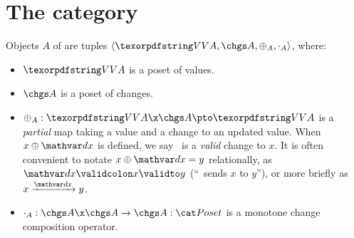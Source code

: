 \newcommand\upd{\mathbin{\oplus}}
\newcommand\updfn{\ensuremath{{\upd}}}
\newcommand\compose\cdot
\newcommand\composefn{\ensuremath{{\compose}}}
\newcommand\changeto\rightsquigarrow
\newcommand\changetofn{\ensuremath{{\changeto}}}

\newcommand\incdenfn{\mathcal{D}}
\newcommand\incdens{\incdenfn} %
\newcommand\incden[1]{\incdenfn({#1})}
\renewcommand\incden[1]{\langle\kern -.26em\langle{#1}\rangle\kern -.26em\rangle}
\renewcommand\incden[1]{\{\kern-.18em\{\kern-.05em{#1}\kern-.05em\}\kern -.18em\}}
\renewcommand\incdens\incden
\renewcommand\incdenfn{\ensuremath{\incden{-}}}


\section{The category \CP}


Objects $A$ of \CP{} are tuples $\tuple{\vals A, \chgs A, \updfn_A,
  \composefn_A}$, where:

\begin{itemize}
\item $\vals A$ is a poset of values.

\item $\chgs A$ is a poset of changes.

\item $\updfn_A : \vals A \x \chgs A \pto \vals A$ is a \emph{partial} map
  taking a value and a change to an updated value. When $x \upd \dx$ is defined,
  we say \dx\ is a \emph{valid} change to $x$. It is often convenient to notate
  $x \upd \dx = y$ relationally, as $\valid\dx x y$ (``\dx\ sends $x$ to $y$''),
  or more briefly as $\vld\dx x y$.

\item $\composefn_A : \chgs A \x \chgs A \to \chgs A : \Poset$ is a monotone
  change composition operator.
\end{itemize}

